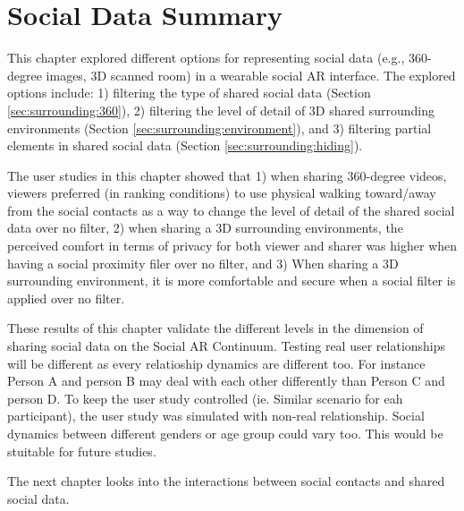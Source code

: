 \pagebreak
\section{Social Data Summary}

This chapter explored different options for representing social data (e.g., 360-degree images, 3D scanned room) in a wearable social AR interface. The explored options include: 1) filtering the type of shared social data (Section \ref{sec:surrounding:360}), 2) filtering the level of detail of 3D shared surrounding environments (Section \ref{sec:surrounding:environment}), and 3) filtering partial elements in shared social data (Section \ref{sec:surrounding:hiding}). 


The user studies in this chapter showed that 1) when sharing 360-degree videos, viewers preferred (in ranking conditions) to use physical walking toward/away from the social contacts as a way to change the level of detail of the shared social data over no filter, 2) when sharing a 3D surrounding environments, the perceived comfort in terms of privacy for both viewer and sharer was higher when having a social proximity filer over no filter, and 3)  When sharing a 3D surrounding environment, it is more comfortable and secure when a social filter is applied over no filter.

These results of this chapter validate the different levels in the dimension of sharing social data on the Social AR Continuum. Testing real user relationships will be different as every relatioship dynamics are different too. For instance Person A and person B may deal with each other differently than Person C and person D. To keep the user study controlled (ie. Similar scenario for eah participant), the user study was simulated with non-real relationship. Social dynamics between different genders or age group could vary too. This would be stuitable for future studies. 

The next chapter looks into the interactions between social contacts and shared social data. 